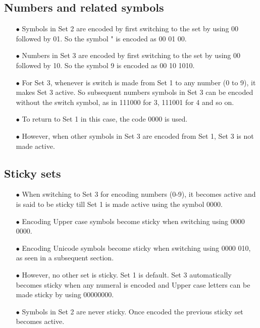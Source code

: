 \documentclass[]{article}
\begin{document}
\subsection{Numbers and related symbols}
\begin{itemize}
	\item[$\bullet$] Symbols in Set 2 are encoded by first switching to the set by using 00 followed by 01.  So the symbol " is encoded as 00 01 00.
	\item[$\bullet$] Numbers in Set 3 are encoded by first switching to the set by using 00 followed by 10.  So the symbol 9 is encoded as 00 10 1010.
	\item[$\bullet$] For Set 3, whenever is switch is made from Set 1 to any number (0 to 9), it makes Set 3 active. So subsequent numbers symbols in Set 3 can be encoded without the switch symbol, as in 111000 for 3, 111001 for 4 and so on.
	\item[$\bullet$] To return to Set 1 in this case, the code 0000 is used.
	\item[$\bullet$] However, when other symbols in Set 3 are encoded from Set 1, Set 3 is not made active.
\end{itemize}

\subsection{Sticky sets}
\begin{itemize}
	\item[$\bullet$] When switching to Set 3 for encoding numbers (0-9), it becomes active and is said to be sticky till Set 1 is made active using the symbol 0000.
	\item[$\bullet$] Encoding Upper case symbols become sticky when switching using 0000 0000.
	\item[$\bullet$] Encoding Unicode symbols become sticky when switching using 0000 010, as seen in a subsequent section.
	\item[$\bullet$] However, no other set is sticky. Set 1 is default. Set 3 automatically becomes sticky when any numeral is encoded and Upper case letters can be made sticky by using 00000000.
	\item[$\bullet$] Symbols in Set 2 are never sticky. Once encoded the previous sticky set becomes active.
\end{itemize}
\end{document}
